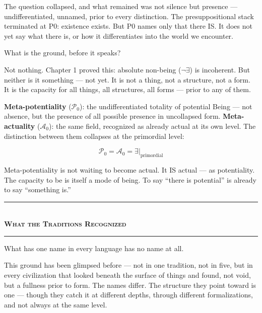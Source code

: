 \documentclass[10pt, openany, oneside]{book}
\renewcommand{\normalsize}{\fontsize{10}{13}\selectfont}
\begin{document}
The question collapsed, and what remained was not silence but presence --- undifferentiated, unnamed, prior to every distinction. The presuppositional stack terminated at P0: existence exists. But P0 names only that there IS. It does not yet say what there is, or how it differentiates into the world we encounter.

What is the ground, before it speaks?

Not nothing. Chapter 1 proved this: absolute non-being ($\neg\exists$) is incoherent. But neither is it something --- not yet. It is not a thing, not a structure, not a form. It is the capacity for all things, all structures, all forms --- prior to any of them.

\textbf{Meta-potentiality} ($\mathcal{P}_0$): the undifferentiated totality of potential Being --- not absence, but the presence of all possible presence in uncollapsed form. \textbf{Meta-actuality} ($\mathcal{A}_0$): the same field, recognized as already actual at its own level. The distinction between them collapses at the primordial level:

$$\mathcal{P}_0 = \mathcal{A}_0 = \exists|_{\text{primordial}}$$

Meta-potentiality is not waiting to become actual. It IS actual --- as potentiality. The capacity to be is itself a mode of being. To say ``there is potential'' is already to say ``something is.''

\vspace{1.5em}


\begin{center}
    \rule{0.3\textwidth}{0.4pt}\\[0.5em]
    {\normalsize\bfseries\scshape What the Traditions Recognized}\\[0.3em]
    \rule{0.3\textwidth}{0.4pt}
\end{center}

\vspace{1em}

\noindent What has one name in every language has no name at all.

This ground has been glimpsed before --- not in one tradition, not in five, but in every civilization that looked beneath the surface of things and found, not void, but a fullness prior to form. The names differ. The structure they point toward is one --- though they catch it at different depths, through different formalizations, and not always at the same level.
\end{document}
